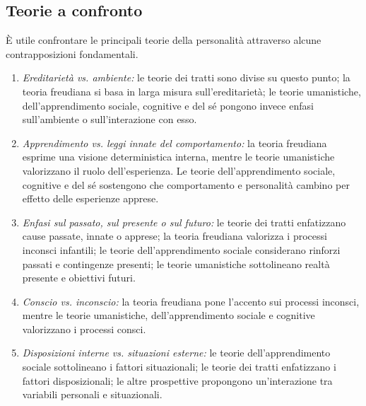 \documentclass[a4paper]{article}
\begin{document}
\subsection{Teorie a confronto}
È utile confrontare le principali teorie della personalità attraverso alcune contrapposizioni fondamentali.
\begin{enumerate}
    \item \emph{Ereditarietà vs. ambiente:} le teorie dei tratti sono divise su questo punto; la teoria freudiana si basa in larga misura sull'ereditarietà; le teorie umanistiche, dell'apprendimento sociale, cognitive e del sé pongono invece enfasi sull'ambiente o sull'interazione con esso.
    \item \emph{Apprendimento vs. leggi innate del comportamento:} la teoria freudiana esprime una visione deterministica interna, mentre le teorie umanistiche valorizzano il ruolo dell'esperienza. Le teorie dell'apprendimento sociale, cognitive e del sé sostengono che comportamento e personalità cambino per effetto delle esperienze apprese.
    \item \emph{Enfasi sul passato, sul presente o sul futuro:} le teorie dei tratti enfatizzano cause passate, innate o apprese; la teoria freudiana valorizza i processi inconsci infantili; le teorie dell'apprendimento sociale considerano rinforzi passati e contingenze presenti; le teorie umanistiche sottolineano realtà presente e obiettivi futuri.
    \item \emph{Conscio vs. inconscio:} la teoria freudiana pone l'accento sui processi inconsci, mentre le teorie umanistiche, dell'apprendimento sociale e cognitive valorizzano i processi consci.
    \item \emph{Disposizioni interne vs. situazioni esterne:} le teorie dell'apprendimento sociale sottolineano i fattori situazionali; le teorie dei tratti enfatizzano i fattori disposizionali; le altre prospettive propongono un'interazione tra variabili personali e situazionali.
\end{enumerate}
\end{document}
